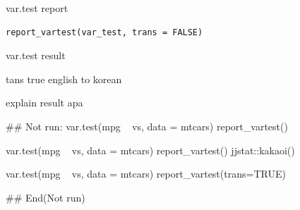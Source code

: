 \documentclass[a4paper]{book}
\begin{document}
%
\begin{Description}
var.test report
\end{Description}
%
\begin{Usage}
\begin{verbatim}
report_vartest(var_test, trans = FALSE)
\end{verbatim}
\end{Usage}
%
\begin{Arguments}
\begin{ldescription}
\item[\code{var\_test}] var.test result

\item[\code{trans}] tans true english to korean
\end{ldescription}
\end{Arguments}
%
\begin{Value}
explain result apa
\end{Value}
%
\begin{Examples}
\begin{ExampleCode}
\#\# Not run: 
var.test(mpg ~ vs, data = mtcars)%
     report_vartest()

var.test(mpg ~ vs, data = mtcars)%
     report_vartest() %
     jjstat::kakaoi()

var.test(mpg ~ vs, data = mtcars)%
report_vartest(trans=TRUE)


## End(Not run)
\end{ExampleCode}
\end{Examples}
\end{document}
